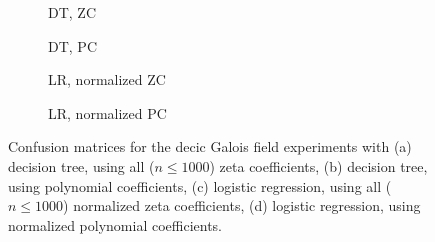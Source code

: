 \documentclass[letterpaper, 10pt]{article}
\newcommand{\1}{\mathds{1}}	%
\theoremstyle{definition}
\theoremstyle{remark}
\begin{document}
\begin{figure}[h]
    \centering
    \begin{subfigure}[t]{0.23\textwidth}
        \centering
        \caption{DT, ZC}
        \label{fig:decic_dt_zc}
    \end{subfigure}
    \hfill
    \begin{subfigure}[t]{0.23\textwidth}
        \centering
        \caption{DT, PC}
        \label{fig:decic_dt_pc}
    \end{subfigure}
    \hfill
    \begin{subfigure}[t]{0.23\textwidth}
        \centering
        \caption{LR, normalized ZC}
        \label{fig:decic_lr_zc_normalized}
    \end{subfigure}
    \hfill
    \begin{subfigure}[t]{0.23\textwidth}
        \centering
        \caption{LR, normalized PC}
        \label{fig:decic_lr_pc_normalized}
    \end{subfigure}
    \caption{Confusion matrices for the decic Galois field experiments with (a) decision tree, using all ($n \le 1000$) zeta coefficients, (b) decision tree, using polynomial coefficients, (c) logistic regression, using all ($n \le 1000$) normalized zeta coefficients, (d) logistic regression, using normalized polynomial coefficients.}
    \label{fig:galois_10_cm}
\end{figure}
\end{document}
